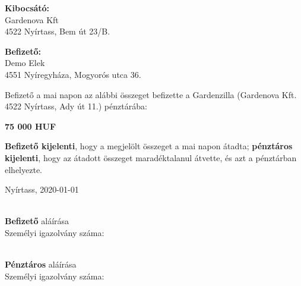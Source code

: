 \documentclass{article}
\begin{document}
\rule[2\baselineskip]{0pt}{0pt}%
\begin{minipage}[t]{0.45\textwidth}
  \textbf {Kibocsátó:}\\
  Gardenova Kft\\
  4522 Nyírtass, Bem út 23/B.
\end{minipage}
\hfill
\begin{minipage}[t]{0.45\textwidth}
  \textbf {Befizető:}\\
  Demo Elek\\
  4551 Nyíregyháza, Mogyorós utca 36.
\end{minipage}

\rule[4\baselineskip]{0pt}{0pt}%

\begin{minipage}[t]{0.9\textwidth}
  {\normalsize Befizető a mai napon az alábbi összeget befizette a Gardenzilla (Gardenova Kft. 4522 Nyírtass, Ady út 11.) pénztárába:}

  \begin{center}
    {\bf \Large 75 000 HUF}
  \end{center}

  \bigskip

  {\bf Befizető kijelenti}, hogy a megjelölt összeget a mai napon átadta; {\bf pénztáros kijelenti}, hogy az átadott összeget maradéktalanul átvette, és azt a pénztárban elhelyezte.

  \rule[2\baselineskip]{0pt}{0pt}


  Nyírtass, 2020-01-01
\end{minipage}

\rule[2\baselineskip]{0pt}{0pt}

\begin{minipage}[t]{0.45\textwidth}
  \makebox[2.5in]{\hrulefill} \\
  {\bf Befizető} aláírása \\
  Személyi igazolvány száma:
\end{minipage}
\hfill
\begin{minipage}[t]{0.45\textwidth}
  \makebox[2.5in]{\hrulefill} \\
  {\bf Pénztáros} aláírása\\
  Személyi igazolvány száma:
\end{minipage}

\rule[2\baselineskip]{0pt}{0pt}
\end{document}
